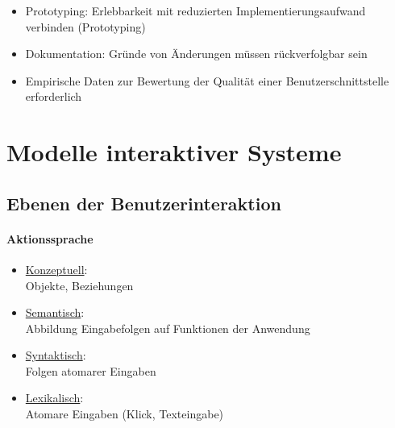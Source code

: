 \documentclass[8pt,a4paper,landscape]{extarticle}
\begin{document}
\begin{multicols*}{4}
\begin{itemize}
\begin{itemize}[nolistsep]
\begin{itemize}[nolistsep]
				            \item Prototyping: Erlebbarkeit mit reduzierten
				                  Implementierungsaufwand verbinden (Prototyping)
				            \item Dokumentation: Gründe von Änderungen müssen
				                  rückverfolgbar sein
			            \end{itemize}
		      \end{itemize}
		      \begin{itemize}[nolistsep]
			      \item Empirische Daten zur Bewertung der Qualität einer
			            Benutzerschnittstelle erforderlich
		      \end{itemize}
	\end{itemize}
	\section{Modelle interaktiver Systeme}
	\subsection{Ebenen der Benutzerinteraktion}
	\begin{center}
		\begin{minipage}{0.49\linewidth}
			\paragraph{Aktionssprache}
			\begin{itemize}
				\item \underline{Konzeptuell}:\\
				      Objekte, Beziehungen
				\item \underline{Semantisch}:\\
				      Abbildung Eingabefolgen auf Funktionen der Anwendung
				\item \underline{Syntaktisch}:\\
				      Folgen atomarer Eingaben
				\item \underline{Lexikalisch}:\\
				      Atomare Eingaben (Klick, Texteingabe)

			\end{itemize}
		\end{minipage}
		\begin{minipage}{0.49\linewidth}

\end{minipage}
\end{center}
\end{multicols*}
\end{document}
